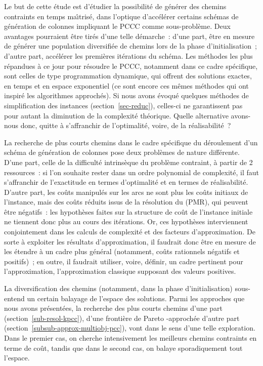 \documentclass[10pt,francais]{llncs}
\begin{document}
{Le but de cette \'etude est d'\'etudier la possibilit\'e de g\'en\'erer des chemins contraints en temps ma\^{\i}tris\'e, dans l'optique d'acc\'el\'erer certains sch\'emas de g\'en\'eration de colonnes impliquant le PCCC comme sous-probl\`eme. Deux avantages pourraient \^etre tir\'es d'une telle d\'emarche~: d'une part, \^etre en mesure de g\'en\'erer une population diversifi\'ee de chemins lors de la phase d'initialisation~; d'autre part, acc\'el\'erer les premi\`eres it\'erations du sch\'ema. Les m\'ethodes les plus r\'epandues \`a ce jour pour r\'esoudre le PCCC, notamment dans ce cadre sp\'ecifique, sont celles de type programmation dynamique, qui offrent des solutions exactes, en temps et en espace exponentiel (ce sont encore ces m\^emes m\'ethodes qui ont inspir\'e les algorithmes approch\'es). Si nous avons \'evoqu\'e quelques m\'ethodes de simplification des instances (section~\ref{sec-reduc}), celles-ci ne garantissent pas pour autant la diminution de la complexit\'e th\'eorique. Quelle alternative avons-nous donc, quitte \`a s'affranchir de l'optimalit\'e, voire, de la r\'ealisabilit\'e~? 

La recherche de plus courts chemins dans le cadre sp\'ecifique du d\'eroulement d'un sch\'ema de g\'en\'eration de colonnes pose deux probl\`emes de nature diff\'erente. D'une part, celle de la difficult\'e intrins\`eque du probl\`eme contraint, \`a partir de 2 ressources~: si l'on souhaite rester dans un ordre polynomial de complexit\'e, il faut s'affranchir de l'exactitude en termes d'optimalit\'e et en termes de r\'ealisabilit\'e. D'autre part, les co\^uts manipul\'es sur les arcs ne sont plus les co\^uts initiaux de l'instance, mais des co\^uts r\'eduits issus de la r\'esolution du (PMR), qui peuvent \^etre n\'egatifs~: les hypoth\`eses faites sur la structure de co\^ut de l'instance initiale ne tiennent donc plus au cours des it\'erations. Or, ces hypoth\`eses interviennent conjointement dans les calculs de complexit\'e et des facteurs d'approximation. De sorte \`a exploiter les r\'esultats d'approximation, il faudrait donc \^etre en mesure de les \'etendre \`a un cadre plus g\'en\'eral (notamment, co\^uts rationnels n\'egatifs et positifs)~; en outre, il faudrait utiliser, voire, d\'efinir, un cadre pertinent pour l'approximation, l'approximation classique supposant des valeurs positives.

La diversification des chemins (notamment, dans la phase d'initialisation) sous-entend un certain balayage de l'espace des solutions. Parmi les approches que nous avons pr\'esent\'ees, la recherche des  plus courts chemins d'une part (section~\ref{sub-resol-kpcc}), d'une fronti\`ere de Pareto -approch\'ee d'autre part (section~\ref{subsub-approx-multiobj-pcc}), vont dans le sens d'une telle exploration. Dans le premier cas, on cherche intensivement les meilleurs chemins contraints en terme de co\^ ut, tandis que dans le second cas, on balaye sporadiquement tout l'espace.

}
\end{document}
